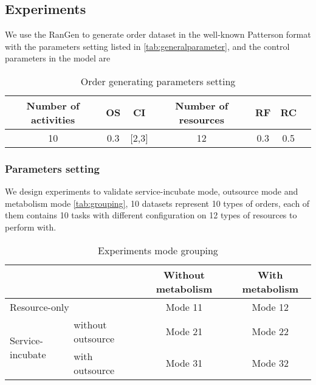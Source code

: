 \subsection{Experiments} %
\label{ssub:case_design}
We use the RanGen\cite{Demeulemeester2003} to generate order dataset in the well-known Patterson format with the parameters setting listed in \autoref{tab:generalparameter}, and the control parameters in the model are

\begin{table}[htbp]
  \centering
  \scriptsize
	\caption{Order generating parameters setting}
    \begin{tabular}{ccccccc}
    \toprule
    \textbf{Number of activities} & \textbf{OS} & \textbf{CI} & \textbf{Number of resources} & \textbf{RF} & \textbf{RC} \\
    \midrule
     10  &   0.3    &  [2,3]     &   12     &  0.3     &   0.5     \\
    \bottomrule
    \end{tabular}%
    {}
  \label{tab:generalparameter}%
\end{table}%



\subsubsection{Parameters setting} %
\label{ssub:parameters_setting}
We design experiments to validate service-incubate mode, outsource mode and metabolism mode \autoref{tab:grouping}, 10 datasets represent 10 types of orders, each of them contains 10 tasks with different configuration on 12 types of resources to perform with. 

\begin{table}[htbp]
  \centering
  \scriptsize
  \caption{Experiments mode grouping}
    \begin{tabular}{llcc}
    \toprule
          &       & Without metabolism & With metabolism \\
    \midrule
    \multicolumn{2}{l}{Resource-only} & Mode 11 & Mode 12 \\\hline
    \multicolumn{1}{l}{\multirow{2}[0]{*}{Service-incubate}} & without outsource & Mode 21 &Mode 22 \\\cline{2-4}
    \multicolumn{1}{l}{} & with outsource & Mode 31 & Mode 32 \\
    \bottomrule
    \end{tabular}%
  \label{tab:grouping}%
\end{table}%

